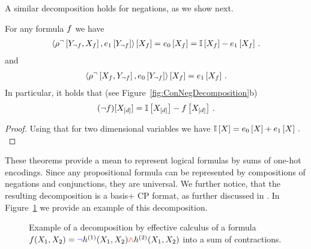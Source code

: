A similar decomposition holds for negations, as we show next.

\begin{theorem}
	For any formula $f$ we have
	\begin{align*}
		\left\langle 
			\rho^{\lnot}\left[Y_{\lnot f},X_{f}\right],e_1\left[Y_{\lnot f}\right]
		\right\rangle \left[ X_{f} \right]
		= e_0\left[X_{f}\right] =  \mathbb{I}\left[X_{f}\right] - e_1\left[X_{f}\right] \, .
	\end{align*}
	and
	\begin{align*}
		\left\langle 
			\rho^{\lnot}\left[X_{f},Y_{\lnot f}\right],e_0\left[Y_{\lnot f}\right]
		\right\rangle \left[ X_{f} \right]
		= e_1\left[X_{f}\right] \, .
	\end{align*}
	In particular, it holds that (see Figure~\ref{fig:ConNegDecomposition}b)
	\begin{align*}
		(\lnot f)[X_{[d]}] = \mathbb{I}\left[X_{[d]}\right] - f\left[X_{[d]}\right]  \, .
	\end{align*}
\end{theorem}
\begin{proof}
	Using that for two dimensional variables we have $\mathbb{I}\left[X\right]=e_0\left[X\right]+e_1\left[X\right]\, .$
\end{proof}

These theorems provide a mean to represent logical formulas by sums of one-hot encodings.
Since any propositional formula can be represented by compositions of negations and conjunctions, they are universal.
We further notice, that the resulting decomposition is a basis+ CP format, as further discussed in .
In Figure~\ref{fig:DecompositionExample} we provide an example of this decomposition.


\begin{figure}
\begin{center}
	
\end{center}
\caption{
	Example of a decomposition by effective calculus of a formula $f(X_{1},X_{2}) = \textcolor{blue}{\lnot} h^{(1)}(X_{1},X_{2}) \textcolor{red}{\land}  h^{(2)}(X_{1},X_{2})$ into a sum of contractions.}
	\label{fig:DecompositionExample}
\end{figure}


